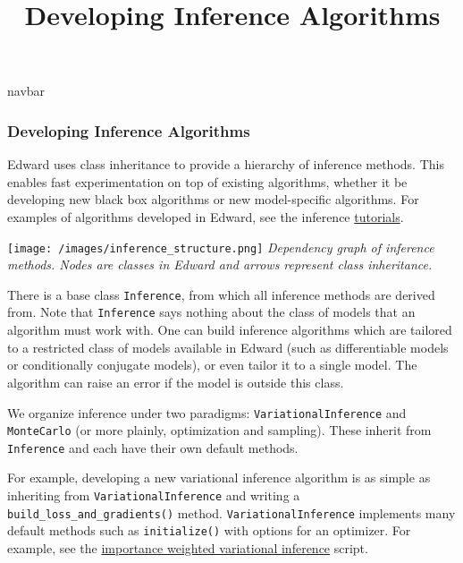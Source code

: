 \title{Developing Inference Algorithms}

{{navbar}}

\subsubsection{Developing Inference Algorithms}

Edward uses class inheritance to provide a hierarchy of inference
methods. This enables fast experimentation on top of existing
algorithms, whether it be developing new black box algorithms or
new model-specific algorithms.
For examples of algorithms developed in Edward, see the inference
\href{/tutorials/}{tutorials}.

\texttt{[image: /images/inference\_structure.png]}
{\small\textit{Dependency graph of inference methods.
Nodes are classes in Edward and arrows represent class inheritance.}}

There is a base class \texttt{Inference}, from which all inference
methods are derived from. Note that \texttt{Inference} says nothing
about the class of models that an algorithm must work with. One can
build inference algorithms which are tailored to a restricted class of
models available in Edward (such as differentiable models or
conditionally conjugate models), or even tailor it to a single model.
The algorithm can raise an error if the model is outside this class.

We organize inference under two paradigms:
\texttt{VariationalInference} and \texttt{MonteCarlo} (or more plainly,
optimization and sampling). These inherit from \texttt{Inference} and each
have their own default methods.

For example, developing a new variational inference algorithm is as simple as
inheriting from \texttt{VariationalInference} and writing a
\texttt{build_loss_and_gradients()} method. \texttt{VariationalInference} implements many default methods such
as \texttt{initialize()} with options for an optimizer.
For example, see the
\href{https://github.com/blei-lab/edward/blob/master/examples/tf_iwvi.py}{importance
weighted variational inference} script.
